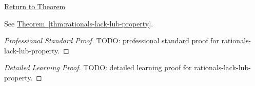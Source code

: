 \newpage
{}
\label{prf:rationals-lack-lub-property}

\begin{remark*}[Return]
\hyperref[thm:rationals-lack-lub-property]{Return to Theorem}
\end{remark*}

\begin{theorem*}
See \hyperref[thm:rationals-lack-lub-property]{Theorem~\ref*{thm:rationals-lack-lub-property}}.
\end{theorem*}

\begin{proof}[Professional Standard Proof]
\LRAProofBodyStart
TODO: professional standard proof for rationals-lack-lub-property.
\end{proof}

\begin{proof}[Detailed Learning Proof]
\LRAProofBodyStart
TODO: detailed learning proof for rationals-lack-lub-property.
\end{proof}

\begin{remark*}
\end{remark*}

\begin{dependencies}
\NoLocalDependencies
\end{dependencies}

\clearpage

